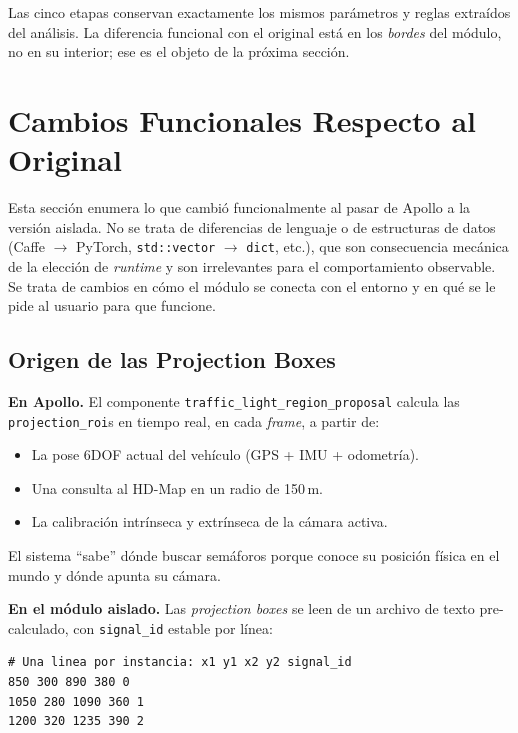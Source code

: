 Las cinco etapas conservan exactamente los mismos parámetros y reglas extraídos del análisis. La diferencia funcional con el original está en los \textit{bordes} del módulo, no en su interior; ese es el objeto de la próxima sección.

\section{Cambios Funcionales Respecto al Original}
\label{sec:cambios_funcionales}

Esta sección enumera lo que cambió funcionalmente al pasar de Apollo a la versión aislada. No se trata de diferencias de lenguaje o de estructuras de datos (Caffe $\to$ PyTorch, \texttt{std::vector} $\to$ \texttt{dict}, etc.), que son consecuencia mecánica de la elección de \textit{runtime} y son irrelevantes para el comportamiento observable. Se trata de cambios en cómo el módulo se conecta con el entorno y en qué se le pide al usuario para que funcione.

\subsection{Origen de las Projection Boxes}

\textbf{En Apollo.} El componente \texttt{traffic\_light\_region\_proposal} calcula las \texttt{projection\_roi}s en tiempo real, en cada \textit{frame}, a partir de:
\begin{itemize}
    \item La pose 6DOF actual del vehículo (GPS + IMU + odometría).
    \item Una consulta al HD-Map en un radio de 150\,m.
    \item La calibración intrínseca y extrínseca de la cámara activa.
\end{itemize}

El sistema ``sabe'' dónde buscar semáforos porque conoce su posición física en el mundo y dónde apunta su cámara.

\textbf{En el módulo aislado.} Las \textit{projection boxes} se leen de un archivo de texto pre-calculado, con \texttt{signal\_id} estable por línea:

\begin{codesnippet}
\begin{verbatim}
# Una linea por instancia: x1 y1 x2 y2 signal_id
850 300 890 380 0
1050 280 1090 360 1
1200 320 1235 390 2
\end{verbatim}
\end{codesnippet}

